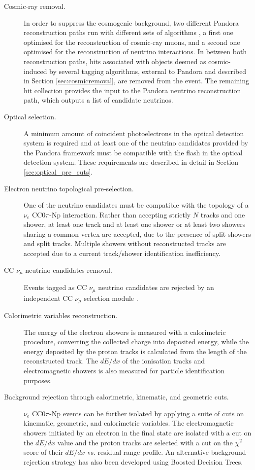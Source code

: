\begin{description}
\item[Cosmic-ray removal.] In order to suppress the cosmogenic background, two different Pandora reconstruction paths run with different sets of algorithms \cite{Acciarri:2017hat}, a first one optimised for the reconstruction of cosmic-ray muons, and a second one optimised for the reconstruction of neutrino interactions. In between both reconstruction paths, hits associated with objects deemed as cosmic-induced by several tagging algorithms, external to Pandora and described in Section \ref{sec:cosmicremoval}, are removed from the event. The remaining hit collection provides the input to the Pandora neutrino reconstruction path, which outputs a list of candidate neutrinos.

\item[Optical selection.] A minimum amount of coincident photoelectrons in the optical detection system is required and at least one of the neutrino candidates provided by the Pandora framework must be compatible with the flash in the optical detection system. These requirements are described in detail in Section \ref{sec:optical_pre_cuts}.

\item[Electron neutrino topological pre-selection.] One of the neutrino candidates must be compatible with the topology of a $\nu_{e}$ CC0$\pi$-Np interaction. Rather than accepting strictly $N$ tracks and one shower, at least one track and at least one shower or at least two showers sharing a common vertex are accepted, due to the presence of split showers and split tracks. Multiple showers without reconstructed tracks are accepted due to a current track/shower identification inefficiency.

\item[CC $\nu_{\mu}$ neutrino candidates removal.] Events tagged as CC $\nu_{\mu}$ neutrino candidates are rejected by an independent CC $\nu_{\mu}$ selection module \cite{ubxsec}. 

\item[Calorimetric variables reconstruction.] The energy of the electron showers is measured with a calorimetric procedure, converting the collected charge into deposited energy, while the energy deposited by the proton tracks is calculated from the length of the reconstructed track. The $dE/dx$ of the ionisation tracks and electromagnetic showers is also measured for particle identification purposes.

\item[Background rejection through calorimetric, kinematic, and geometric cuts.] $\nu_{e}$ CC0$\pi$-Np events can be further isolated by applying a suite of cuts on kinematic, geometric, and calorimetric variables. The electromagnetic showers initiated by an electron in the final state are isolated with a cut on the $dE/dx$ value and the proton tracks are selected with a cut on the $\chi^{2}$ score of their $dE/dx$ vs. residual range profile. An alternative background-rejection strategy has also been developed using Boosted Decision Trees.
\end{description}

